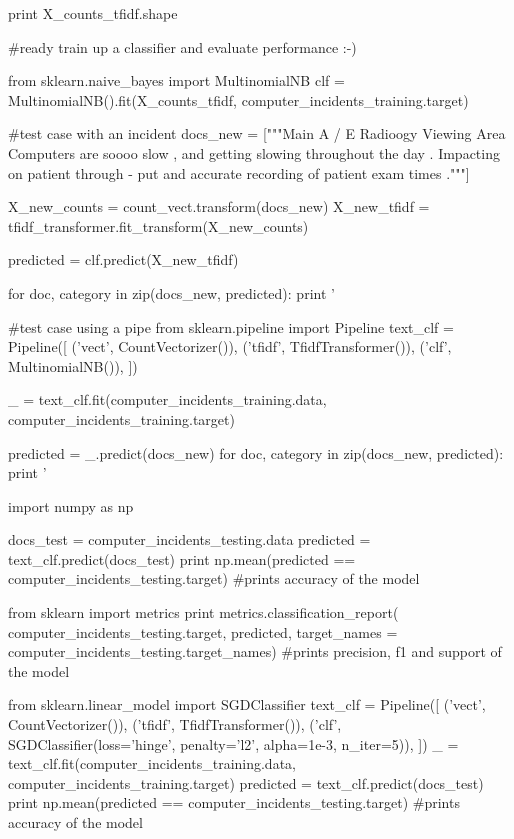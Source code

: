 \begin{pyverbatim}
print X_counts_tfidf.shape

#ready train up a classifier and evaluate performance :-)

from sklearn.naive_bayes import MultinomialNB
clf = MultinomialNB().fit(X_counts_tfidf, computer_incidents_training.target)

#test case with an incident
docs_new = ["""Main A / E Radioogy Viewing Area Computers are soooo slow , 
and getting slowing throughout the day . Impacting on patient through - put 
and accurate recording of patient exam times ."""]

X_new_counts = count_vect.transform(docs_new)
X_new_tfidf = tfidf_transformer.fit_transform(X_new_counts)

predicted = clf.predict(X_new_tfidf)

for doc, category in zip(docs_new, predicted):
    print '%

#test case using a pipe
from sklearn.pipeline import Pipeline
text_clf = Pipeline([
    ('vect', CountVectorizer()),
    ('tfidf', TfidfTransformer()),
    ('clf', MultinomialNB()),
    ])

_ = text_clf.fit(computer_incidents_training.data, computer_incidents_training.target)

predicted = _.predict(docs_new)
for doc, category in zip(docs_new, predicted):
        print '%

import numpy as np

docs_test = computer_incidents_testing.data
predicted = text_clf.predict(docs_test)
print np.mean(predicted == computer_incidents_testing.target) 
#prints accuracy of the model

from sklearn import metrics
print metrics.classification_report(
    computer_incidents_testing.target, predicted,
    target_names = computer_incidents_testing.target_names) 
#prints precision, f1 and support of the model



from sklearn.linear_model import SGDClassifier
text_clf = Pipeline([
     ('vect', CountVectorizer()),
     ('tfidf', TfidfTransformer()),
     ('clf', SGDClassifier(loss='hinge', penalty='l2',
                           alpha=1e-3, n_iter=5)),
])
_ = text_clf.fit(computer_incidents_training.data, computer_incidents_training.target)
predicted = text_clf.predict(docs_test)
print np.mean(predicted == computer_incidents_testing.target)
#prints accuracy of the model


\end{pyverbatim}

